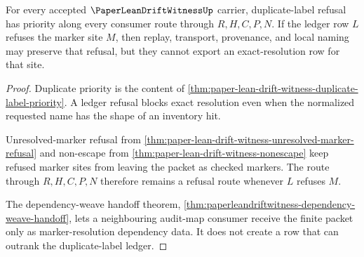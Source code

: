 \begin{theorem}
\label{thm:paper-lean-drift-witness-duplicate-ledger-readiness}
For every accepted $\PaperLeanDriftWitnessUp$ carrier, duplicate-label refusal has priority along every consumer route through $R,H,C,P,N$. If the ledger row $L$ refuses the marker site $M$, then replay, transport, provenance, and local naming may preserve that refusal, but they cannot export an exact-resolution row for that site.
\end{theorem}
\begin{proof}
Duplicate priority is the content of \autoref{thm:paper-lean-drift-witness-duplicate-label-priority}. A ledger refusal blocks exact resolution even when the normalized requested name has the shape of an inventory hit.

Unresolved-marker refusal from \autoref{thm:paper-lean-drift-witness-unresolved-marker-refusal} and non-escape from \autoref{thm:paper-lean-drift-witness-nonescape} keep refused marker sites from leaving the packet as checked markers. The route through $R,H,C,P,N$ therefore remains a refusal route whenever $L$ refuses $M$.

The dependency-weave handoff theorem, \autoref{thm:paperleandriftwitness-dependency-weave-handoff}, lets a neighbouring audit-map consumer receive the finite packet only as marker-resolution dependency data. It does not create a row that can outrank the duplicate-label ledger.
\end{proof}

